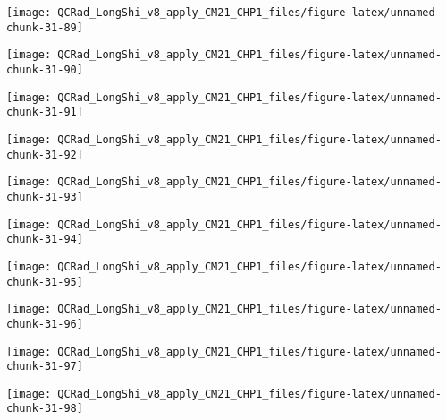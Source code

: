 \documentclass[
  10pt,
  a4paper,oneside]{article}
\begin{document}
\begin{center}\texttt{[image: QCRad\_LongShi\_v8\_apply\_CM21\_CHP1\_files/figure-latex/unnamed-chunk-31-89]} \end{center}

\begin{center}\texttt{[image: QCRad\_LongShi\_v8\_apply\_CM21\_CHP1\_files/figure-latex/unnamed-chunk-31-90]} \end{center}

\begin{center}\texttt{[image: QCRad\_LongShi\_v8\_apply\_CM21\_CHP1\_files/figure-latex/unnamed-chunk-31-91]} \end{center}

\begin{center}\texttt{[image: QCRad\_LongShi\_v8\_apply\_CM21\_CHP1\_files/figure-latex/unnamed-chunk-31-92]} \end{center}

\begin{center}\texttt{[image: QCRad\_LongShi\_v8\_apply\_CM21\_CHP1\_files/figure-latex/unnamed-chunk-31-93]} \end{center}

\begin{center}\texttt{[image: QCRad\_LongShi\_v8\_apply\_CM21\_CHP1\_files/figure-latex/unnamed-chunk-31-94]} \end{center}

\begin{center}\texttt{[image: QCRad\_LongShi\_v8\_apply\_CM21\_CHP1\_files/figure-latex/unnamed-chunk-31-95]} \end{center}

\begin{center}\texttt{[image: QCRad\_LongShi\_v8\_apply\_CM21\_CHP1\_files/figure-latex/unnamed-chunk-31-96]} \end{center}

\begin{center}\texttt{[image: QCRad\_LongShi\_v8\_apply\_CM21\_CHP1\_files/figure-latex/unnamed-chunk-31-97]} \end{center}

\begin{center}\texttt{[image: QCRad\_LongShi\_v8\_apply\_CM21\_CHP1\_files/figure-latex/unnamed-chunk-31-98]} \end{center}
\end{document}
